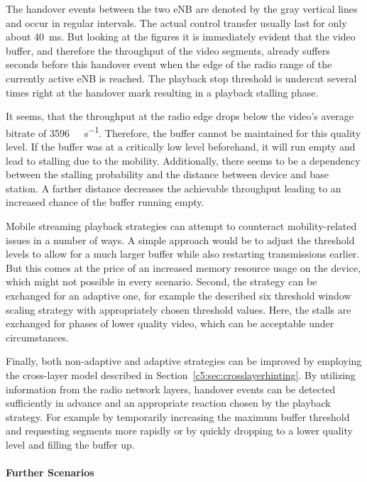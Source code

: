 {The handover events between the two \gls{eNB} are denoted by the gray vertical lines and occur in regular intervals. The actual control transfer usually last for only about \SI{40}{\milli\second}. But looking at the figures it is immediately evident that the video buffer, and therefore the throughput of the video segments, already suffers seconds before this handover event when the edge of the radio range of the currently active \gls{eNB} is reached. The playback stop threshold is undercut several times right at the handover mark resulting in a playback stalling phase.

It seems, that the throughput at the radio edge drops below the video's average bitrate of \SI{3596}{\kilo\bit\per\second}. Therefore, the buffer cannot be maintained for this quality level. If the buffer was at a critically low level beforehand, it will run empty and lead to stalling due to the mobility. Additionally, there seems to be a dependency between the stalling probability and the distance between device and base station. A farther distance decreases the achievable throughput leading to an increased chance of the buffer running empty.

Mobile streaming playback strategies can attempt to counteract mobility-related issues in a number of ways. A simple approach would be to adjust the threshold levels to allow for a much larger buffer while also restarting transmissions earlier. But this comes at the price of an increased memory resource usage on the device, which might not possible in every scenario. Second, the strategy can be exchanged for an adaptive one, for example the described six threshold window scaling strategy with appropriately chosen threshold values. Here, the stalls are exchanged for phases of lower quality video, which can be acceptable under circumstances. 

Finally, both non-adaptive and adaptive strategies can be improved by employing the cross-layer model described in Section~\ref{c5:sec:crosslayerhinting}. By utilizing information from the radio network layers, handover events can be detected sufficiently in advance and an appropriate reaction chosen by the playback strategy. For example by temporarily increasing the maximum buffer threshold and requesting segments more rapidly or by quickly dropping to a lower quality level and filling the buffer up.

\paragraph{Further Scenarios}

}
